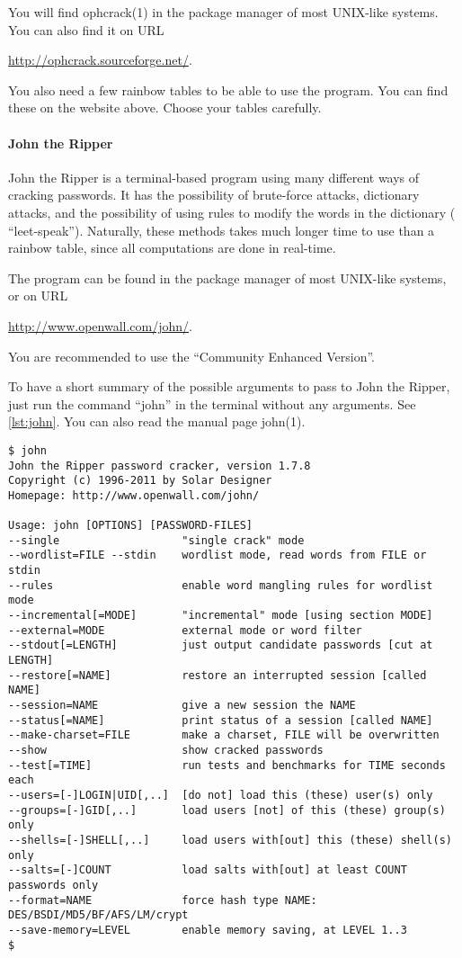You will find ophcrack(1) in the package manager of most UNIX-like systems.
You can also find it on URL
\begin{center}
  \url{http://ophcrack.sourceforge.net/}.
\end{center}
You also need a few rainbow tables to be able to use the program.
You can find these on the website above.
Choose your tables carefully.

\paragraph{John the Ripper}

John the Ripper is a terminal-based program using many different ways of 
cracking passwords.
It has the possibility of brute-force attacks, dictionary attacks, and the 
possibility of using rules to modify the words in the dictionary (\eg 
\enquote{leet-speak}).
Naturally, these methods takes much longer time to use than a rainbow table, 
since all computations are done in real-time.

The program can be found in the package manager of most UNIX-like systems, or 
on URL
\begin{center}
  \url{http://www.openwall.com/john/}.
\end{center}
You are recommended to use the \enquote{Community Enhanced Version}.

To have a short summary of the possible arguments to pass to John the Ripper, 
just run the command \enquote{john} in the terminal without any arguments.
See \cref{lst:john}.
You can also read the manual page john(1).

\begin{lstlisting}[float,caption={Output from John the Ripper in the 
terminal.},label={lst:john},breaklines=false]
$ john
John the Ripper password cracker, version 1.7.8
Copyright (c) 1996-2011 by Solar Designer
Homepage: http://www.openwall.com/john/

Usage: john [OPTIONS] [PASSWORD-FILES]
--single                   "single crack" mode
--wordlist=FILE --stdin    wordlist mode, read words from FILE or stdin
--rules                    enable word mangling rules for wordlist mode
--incremental[=MODE]       "incremental" mode [using section MODE]
--external=MODE            external mode or word filter
--stdout[=LENGTH]          just output candidate passwords [cut at LENGTH]
--restore[=NAME]           restore an interrupted session [called NAME]
--session=NAME             give a new session the NAME
--status[=NAME]            print status of a session [called NAME]
--make-charset=FILE        make a charset, FILE will be overwritten
--show                     show cracked passwords
--test[=TIME]              run tests and benchmarks for TIME seconds each
--users=[-]LOGIN|UID[,..]  [do not] load this (these) user(s) only
--groups=[-]GID[,..]       load users [not] of this (these) group(s) only
--shells=[-]SHELL[,..]     load users with[out] this (these) shell(s) only
--salts=[-]COUNT           load salts with[out] at least COUNT passwords only
--format=NAME              force hash type NAME: DES/BSDI/MD5/BF/AFS/LM/crypt
--save-memory=LEVEL        enable memory saving, at LEVEL 1..3
$
\end{lstlisting}

